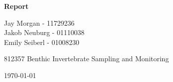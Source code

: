 \begin{titlepage}


\begin{center}                                          %
    \vspace*{3cm}                                           %

    \LARGE                                                  %
    \textbf{{Report}}

    \vspace{0.5cm}                                          %

    \vspace{1.5cm}                                          %

    \Large                                                  %
    Jay Morgan - 11729236\\
    Jakob Neuburg - 01110038\\
    Emily Seiberl - 01008230\\
    \vspace{3cm}                                            %

    812357 Benthic Invertebrate Sampling and Monitoring
    \vspace{.5cm}                                           %

    \today                                                  %
    \vfill                                                  %


\end{center}
\end{titlepage}
